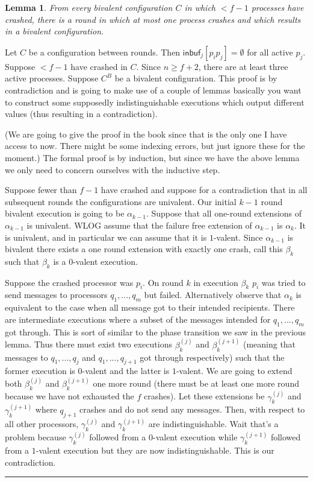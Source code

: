 \documentclass[twoside]{article}
\newtheorem{lemma}[theorem]{Lemma}
\newenvironment{proof}{{\bf Proof:}}{\hfill\rule{2mm}{2mm}}
\newcommand\inbuf{\mathsf{inbuf}}
\begin{document}
\begin{lemma}
From every bivalent configuration $C$ in which $< f-1$ processes have crashed, there is a round in which at most one process crashes and which results in a bivalent configuration. 
\end{lemma}
\begin{proof}
Let $C$ be a configuration between rounds. Then $\inbuf_j[p_ip_j] = \emptyset$ for all active $p_j$. Suppose $< f-1 $ have crashed in $C$. Since $n \geq f+2$, there are at least three active processes. Suppose $C^{B}$ be a bivalent configuration. This proof is by contradiction and is going to make use of a couple of lemmas basically you want to construct some supposedly indistinguishable executions which output different values (thus resulting in a contradiction).

(We are going to give the proof in the book since that is the only one I have access to now. There might be some indexing errors, but just ignore these for the moment.) The formal proof is by induction, but since we have the above lemma we only need to concern ourselves with the inductive step. 

Suppose fewer than $f-1$ have crashed and suppose for a contradiction that in all subsequent rounds the configurations are univalent. Our initial $k-1$ round bivalent execution is going to be $\alpha_{k-1}$. Suppose that all one-round extensions of $\alpha_{k-1}$ is univalent. WLOG assume that the failure free extension of $\alpha_{k-1}$ is $\alpha_k$. It is univalent, and in particular we can assume that it is $1$-valent. Since $\alpha_{k-1}$ is bivalent there exists a one round extension with exactly one crash, call this $\beta_k$ such that $\beta_k$ is a $0$-valent execution. 

Suppose the crashed processor was $p_i$. On round $k$ in execution $\beta_k$ $p_i$ was tried to send messages to processors $q_1, ..., q_m$ but failed. Alternatively observe that $\alpha_k$ is equivalent to the case when all message got to their intended recipients. There are intermediate executions where a subset of the messages intended for $q_1, ..., q_m$ got through. This is sort of similar to the phase transition we saw in the previous lemma. Thus there must exist two executions $\beta_k^{(j)}$ and $\beta_k^{(j+1)}$ (meaning that messages to $q_1, ..., q_j$ and $q_1, ..., q_{j+1}$ got through respectively) such that the former execution is $0$-valent and the latter is $1$-valent. We are going to extend both $\beta_k^{(j)}$ and $\beta_k^{(j+1)}$ one more round (there must be at least one more round because we have not exhausted the $f$ crashes). Let these extensions be $\gamma_k^{(j)}$ and $\gamma_k^{(j+1)}$ where $q_{j+1}$ crashes and do not send any messages. Then, with respect to all other processors, $\gamma_k^{(j)}$ and $\gamma_k^{(j+1)}$ are indistinguishable. Wait that's a problem because $\gamma_k^{(j)}$ followed from a $0$-valent execution while $\gamma_k^{(j+1)}$ followed from a $1$-valent execution but they are now indistinguishable. This is our contradiction.
\end{proof}
\end{document}
